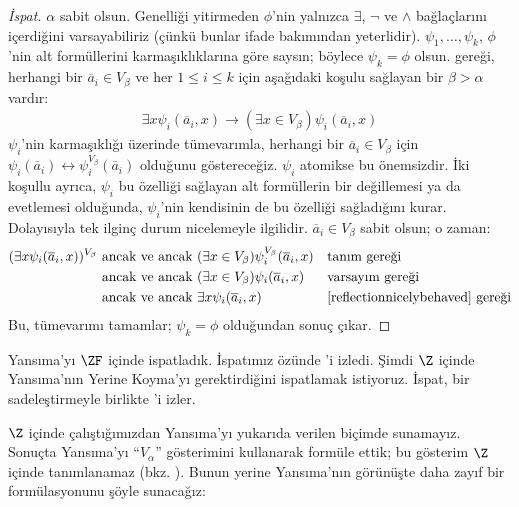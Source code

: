 \documentclass[../../../include/open-logic-section]{subfiles}
\begin{document}
\begin{proof}[İspat] 
$\alpha$ sabit olsun. Genelliği yitirmeden $\phi$'nin yalnızca $\exists$,
$\lnot$ ve $\land$ bağlaçlarını içerdiğini varsayabiliriz (çünkü bunlar ifade
bakımından yeterlidir). $\psi_1, \ldots, \psi_k$, $\phi$'nin alt formüllerini
karmaşıklıklarına göre saysın; böylece $\psi_k = \phi$ olsun.
 gereği, herhangi bir $\overline{a}_i \in V_\beta$ ve
her $1 \leq i \leq k$ için aşağıdaki koşulu sağlayan bir
$\beta > \alpha$ vardır:
\begin{align}\label{reflectionnicelybehaved}
	\exists x\psi_i(\overline{a}_i, x) \rightarrow 
	(\exists x \in V_\beta) \psi_i(\overline{a}_i, x)\tag{*}
\end{align}
$\psi_i$'nin karmaşıklığı üzerinde tümevarımla, herhangi bir
$\overline{a}_i \in V_\beta$ için
$\psi_i(\overline{a}_i) \leftrightarrow
\psi_i^{V_\beta}(\overline{a}_i)$ olduğunu göstereceğiz. $\psi_i$ atomikse
bu önemsizdir. İki koşullu ayrıca, $\psi_i$ bu özelliği sağlayan alt
formüllerin bir değillemesi ya da evetlemesi olduğunda, $\psi_i$'nin
kendisinin de bu özelliği sağladığını kurar. Dolayısıyla tek ilginç durum
nicelemeyle ilgilidir.
$\overline{a}_i \in V_\beta$ sabit olsun; o zaman:
\begin{align*}
	(\exists x \psi_i(\overline{a}_i, x))^{V_\beta}
	&\text{ ancak ve ancak }
	(\exists x \in V_\beta)\psi_i^{V_\beta}(\overline{a}_i, x)
	&&\text{tanım gereği}\\
	&\text{ ancak ve ancak }
	(\exists x \in V_\beta)\psi_i(\overline{a}_i,  x)
	&&\text{varsayım gereği}\\
	&\text{ ancak ve ancak }
	\exists x \psi_i(\overline{a}_i, x)
	&&\text{\eqref{reflectionnicelybehaved} gereği}
\end{align*}
Bu, tümevarımı tamamlar; $\psi_k = \phi$ olduğundan sonuç çıkar.
\end{proof}

Yansıma'yı $\ZF$ içinde ispatladık. İspatımız özünde
\citet{Montague1961}'i izledi. Şimdi $\Z$ içinde Yansıma'nın Yerine Koyma'yı
gerektirdiğini ispatlamak istiyoruz. İspat, bir sadeleştirmeyle birlikte
\citet{Levy1960}'i izler.

$\Z$ içinde çalıştığımızdan Yansıma'yı yukarıda verilen biçimde sunamayız.
Sonuçta Yansıma'yı ``$V_\alpha$'' gösterimini kullanarak formüle ettik; bu
gösterim $\Z$ içinde tanımlanamaz (bkz. ). Bunun
yerine Yansıma'nın görünüşte daha zayıf bir formülasyonunu şöyle sunacağız:
\end{document}
